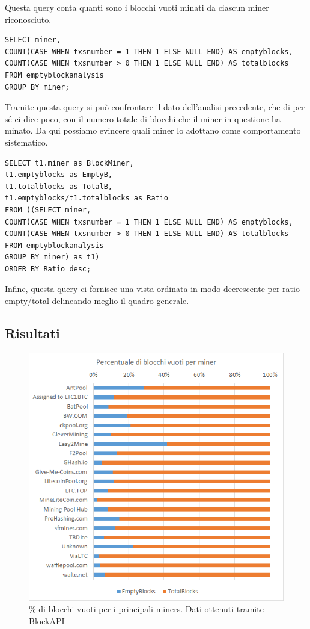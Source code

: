 Questa query conta quanti sono i blocchi vuoti minati da ciascun miner riconosciuto.

\begin{lstlisting}
SELECT miner,
COUNT(CASE WHEN txsnumber = 1 THEN 1 ELSE NULL END) AS emptyblocks,
COUNT(CASE WHEN txsnumber > 0 THEN 1 ELSE NULL END) AS totalblocks
FROM emptyblockanalysis
GROUP BY miner;
\end{lstlisting}

Tramite questa query si può confrontare il dato dell’analisi precedente, che di per sé ci dice poco, con il numero totale di blocchi che il miner in questione ha minato. Da qui possiamo evincere quali miner lo adottano come comportamento sistematico.

\begin{lstlisting}
SELECT t1.miner as BlockMiner,
t1.emptyblocks as EmptyB,
t1.totalblocks as TotalB,
t1.emptyblocks/t1.totalblocks as Ratio 
FROM ((SELECT miner,
COUNT(CASE WHEN txsnumber = 1 THEN 1 ELSE NULL END) AS emptyblocks,
COUNT(CASE WHEN txsnumber > 0 THEN 1 ELSE NULL END) AS totalblocks
FROM emptyblockanalysis
GROUP BY miner) as t1)
ORDER BY Ratio desc;
\end{lstlisting}		

Infine, questa query ci fornisce una vista ordinata in modo decrescente per ratio empty/total delineando meglio il quadro generale.				
\subsection{Risultati}

\begin{figure}[h!]
	\centering
	\includegraphics[width=0.8\linewidth]{images/percentuale-blocchi-vuoti-per-miner}
	\caption{\% di blocchi vuoti per i principali miners. Dati ottenuti tramite BlockAPI}
	\label{fig:percentuale-blocchi-vuoti-per-miner}
\end{figure}


